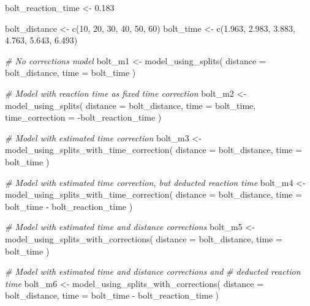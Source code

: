 \documentclass[fleqn,10pt]{wlpeerj} %
\newenvironment{Shaded}{\begin{snugshade}}{\end{snugshade}}
\newcommand{\AttributeTok}[1]{\textcolor[rgb]{0.77,0.63,0.00}{#1}}
\newcommand{\CommentTok}[1]{\textcolor[rgb]{0.56,0.35,0.01}{\textit{#1}}}
\newcommand{\DecValTok}[1]{\textcolor[rgb]{0.00,0.00,0.81}{#1}}
\newcommand{\FloatTok}[1]{\textcolor[rgb]{0.00,0.00,0.81}{#1}}
\newcommand{\FunctionTok}[1]{\textcolor[rgb]{0.00,0.00,0.00}{#1}}
\newcommand{\NormalTok}[1]{#1}
\newcommand{\OtherTok}[1]{\textcolor[rgb]{0.56,0.35,0.01}{#1}}
\newcommand{\SpecialCharTok}[1]{\textcolor[rgb]{0.00,0.00,0.00}{#1}}
\begin{document}
\begin{Shaded}
\begin{Highlighting}[]
\NormalTok{bolt\_reaction\_time }\OtherTok{\textless{}{-}} \FloatTok{0.183}

\NormalTok{bolt\_distance }\OtherTok{\textless{}{-}} \FunctionTok{c}\NormalTok{(}\DecValTok{10}\NormalTok{, }\DecValTok{20}\NormalTok{, }\DecValTok{30}\NormalTok{, }\DecValTok{40}\NormalTok{, }\DecValTok{50}\NormalTok{, }\DecValTok{60}\NormalTok{)}
\NormalTok{bolt\_time }\OtherTok{\textless{}{-}} \FunctionTok{c}\NormalTok{(}\FloatTok{1.963}\NormalTok{, }\FloatTok{2.983}\NormalTok{, }\FloatTok{3.883}\NormalTok{, }\FloatTok{4.763}\NormalTok{, }\FloatTok{5.643}\NormalTok{, }\FloatTok{6.493}\NormalTok{)}

\CommentTok{\# No corrections model}
\NormalTok{bolt\_m1 }\OtherTok{\textless{}{-}} \FunctionTok{model\_using\_splits}\NormalTok{(}
  \AttributeTok{distance =}\NormalTok{ bolt\_distance,}
  \AttributeTok{time =}\NormalTok{ bolt\_time}
\NormalTok{)}

\CommentTok{\# Model with reaction time as fixed time correction}
\NormalTok{bolt\_m2 }\OtherTok{\textless{}{-}} \FunctionTok{model\_using\_splits}\NormalTok{(}
  \AttributeTok{distance =}\NormalTok{ bolt\_distance,}
  \AttributeTok{time =}\NormalTok{ bolt\_time,}
  \AttributeTok{time\_correction =} \SpecialCharTok{{-}}\NormalTok{bolt\_reaction\_time}
\NormalTok{)}

\CommentTok{\# Model with estimated time correction}
\NormalTok{bolt\_m3 }\OtherTok{\textless{}{-}} \FunctionTok{model\_using\_splits\_with\_time\_correction}\NormalTok{(}
  \AttributeTok{distance =}\NormalTok{ bolt\_distance,}
  \AttributeTok{time =}\NormalTok{ bolt\_time}
\NormalTok{)}

\CommentTok{\# Model with estimated time correction, but deducted reaction time}
\NormalTok{bolt\_m4 }\OtherTok{\textless{}{-}} \FunctionTok{model\_using\_splits\_with\_time\_correction}\NormalTok{(}
  \AttributeTok{distance =}\NormalTok{ bolt\_distance,}
  \AttributeTok{time =}\NormalTok{ bolt\_time }\SpecialCharTok{{-}}\NormalTok{ bolt\_reaction\_time}
\NormalTok{)}

\CommentTok{\# Model with estimated time and distance corrections}
\NormalTok{bolt\_m5 }\OtherTok{\textless{}{-}} \FunctionTok{model\_using\_splits\_with\_corrections}\NormalTok{(}
  \AttributeTok{distance =}\NormalTok{ bolt\_distance,}
  \AttributeTok{time =}\NormalTok{ bolt\_time}
\NormalTok{)}

\CommentTok{\# Model with estimated time and distance corrections and}
\CommentTok{\#  deducted reaction time}
\NormalTok{bolt\_m6 }\OtherTok{\textless{}{-}} \FunctionTok{model\_using\_splits\_with\_corrections}\NormalTok{(}
  \AttributeTok{distance =}\NormalTok{ bolt\_distance,}
  \AttributeTok{time =}\NormalTok{ bolt\_time }\SpecialCharTok{{-}}\NormalTok{ bolt\_reaction\_time}
\NormalTok{)}


\end{Highlighting}
\end{Shaded}
\end{document}
